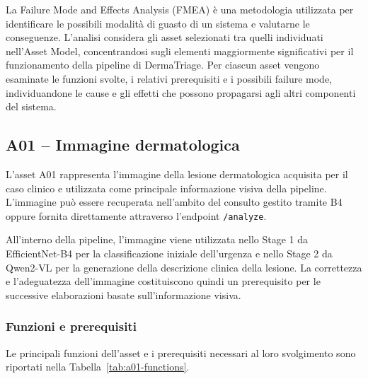 
La Failure Mode and Effects Analysis (FMEA) è una metodologia utilizzata
per identificare le possibili modalità di guasto di un sistema e valutarne
le conseguenze. L'analisi considera gli asset selezionati tra quelli
individuati nell'Asset Model, concentrandosi sugli elementi maggiormente
significativi per il funzionamento della pipeline di DermaTriage. Per
ciascun asset vengono esaminate le funzioni svolte, i relativi prerequisiti
e i possibili failure mode, individuandone le cause e gli effetti che
possono propagarsi agli altri componenti del sistema.

\subsection{A01 -- Immagine dermatologica}

L'asset A01 rappresenta l'immagine della lesione dermatologica acquisita
per il caso clinico e utilizzata come principale informazione visiva
della pipeline. L'immagine può essere recuperata nell'ambito del consulto
gestito tramite B4 oppure fornita direttamente attraverso l'endpoint
\texttt{/analyze}.

All'interno della pipeline, l'immagine viene utilizzata nello Stage 1
da EfficientNet-B4 per la classificazione iniziale dell'urgenza e nello
Stage 2 da Qwen2-VL per la generazione della descrizione clinica della
lesione. La correttezza e l'adeguatezza dell'immagine costituiscono quindi
un prerequisito per le successive elaborazioni basate sull'informazione
visiva.


\subsubsection{Funzioni e prerequisiti}

Le principali funzioni dell'asset e i prerequisiti necessari al loro
svolgimento sono riportati nella Tabella~\ref{tab:a01-functions}.

